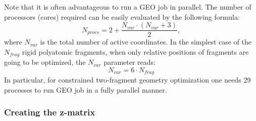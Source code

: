 Note that it is often advantageous to run a GEO job in parallel. The number of
processors (cores) required can be easily evaluated by the following formula\cite{Vysotskiy:13}:
\begin{equation}
N_{procs} = 2 + \frac{N_{var}\cdot\left(N_{var}+3\right)}{2},
\end{equation}
where $N_{var}$ is the total number of active coordinates. In the simplest
case of the $N_{frag}$ rigid polyatomic fragments, when only relative positions of fragments are
going to be optimized, the $N_{var}$ parameter reads:
\begin{equation}
N_{var} = 6\cdot N_{frag}
\end{equation}
In particular, for constrained two-fragment geometry optimization one needs 29 processes
to run GEO job in a fully parallel manner.


\subsubsection{Creating the z-matrix}

